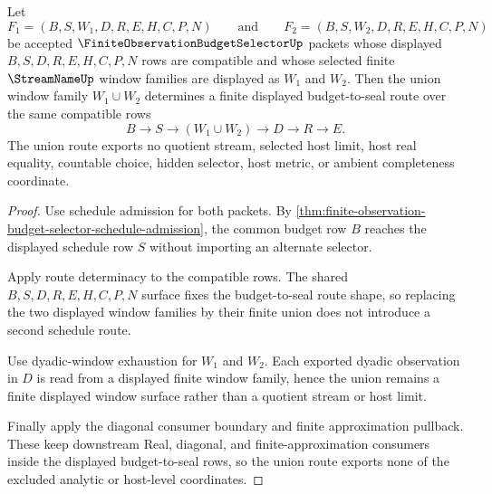 \begin{theorem}
\label{thm:finite-observation-budget-selector-shared-window-union}
Let
$$
F_1=(B,S,W_1,D,R,E,H,C,P,N)
\qquad\text{and}\qquad
F_2=(B,S,W_2,D,R,E,H,C,P,N)
$$
be accepted $\FiniteObservationBudgetSelectorUp$ packets whose displayed $B,S,D,R,E,H,C,P,N$ rows are compatible and whose selected finite $\StreamNameUp$ window families are displayed as $W_1$ and $W_2$. Then the union window family $W_1 \cup W_2$ determines a finite displayed budget-to-seal route over the same compatible rows
$$
B \to S \to (W_1 \cup W_2) \to D \to R \to E.
$$
The union route exports no quotient stream, selected host limit, host real equality, countable choice, hidden selector, host metric, or ambient completeness coordinate.
\end{theorem}
\begin{proof}
Use schedule admission for both packets. By \autoref{thm:finite-observation-budget-selector-schedule-admission}, the common budget row $B$ reaches the displayed schedule row $S$ without importing an alternate selector.

Apply route determinacy to the compatible rows. The shared $B,S,D,R,E,H,C,P,N$ surface fixes the budget-to-seal route shape, so replacing the two displayed window families by their finite union does not introduce a second schedule route.

Use dyadic-window exhaustion for $W_1$ and $W_2$. Each exported dyadic observation in $D$ is read from a displayed finite window family, hence the union remains a finite displayed window surface rather than a quotient stream or host limit.

Finally apply the diagonal consumer boundary and finite approximation pullback. These keep downstream Real, diagonal, and finite-approximation consumers inside the displayed budget-to-seal rows, so the union route exports none of the excluded analytic or host-level coordinates.
\end{proof}

